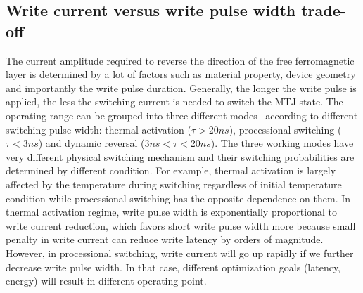 \subsection{Write current versus write pulse width trade-off}
The current amplitude required to reverse the direction of the free ferromagnetic layer is determined by a lot of factors such as material property, device geometry and importantly the write pulse duration. Generally, the longer the write pulse is applied, the less the switching current is needed to switch the MTJ state. The operating range can be grouped into three different modes~\cite{STTRAM:JAP07} according to different switching pulse width: thermal activation ($\tau>20ns$), processional switching ($\tau<3ns$) and dynamic reversal ($3ns<\tau<20ns$). The three working modes have very different physical switching mechanism and their switching probabilities are determined by different condition. For example, thermal activation is largely affected by the temperature during switching regardless of initial temperature condition while processional switching has the opposite dependence on them. In thermal activation regime, write pulse width is exponentially proportional to write current reduction, which favors short write pulse width more because small penalty in write current can reduce write latency by orders of magnitude. However, in processional switching, write current will go up rapidly if we further decrease write pulse width. In that case, different optimization goals (latency, energy) will result in different operating point.

